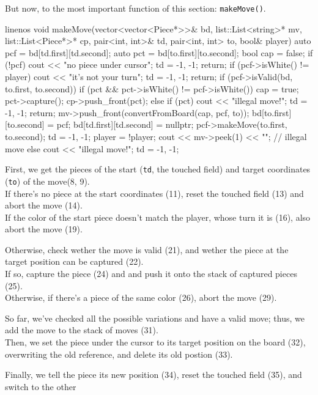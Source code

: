 But now, to the most important function of this section: \texttt{makeMove()}.

\begin{cpp*}{linenos}
void makeMove(vector<vector<Piece*>>& bd,
              list::List<string>* mv,
              list::List<Piece*>* cp,
              pair<int, int>& td,
              pair<int, int> to,
              bool& player)
{
  auto pcf = bd[td.first][td.second];
  auto pct = bd[to.first][to.second];
  bool cap = false;
  if (!pcf) {
    cout << "no piece under cursor\n";
    td = {-1, -1};
    return;
  }
  if (pcf->isWhite() != player) {
    cout << "it's not your turn\n";
    td = {-1, -1};
    return;
  }
  if (pcf->isValid(bd, to.first, to.second)) {
    if (pct && pct->isWhite() != pcf->isWhite()) {
      cap = true;
      pct->capture();
      cp->push_front(pct);
    } else if (pct) {
      cout << "illegal move!\n";
      td = {-1, -1};
      return;
    }
    mv->push_front(convertFromBoard(cap, pcf, to));
    bd[to.first][to.second] = pcf;
    bd[td.first][td.second] = nullptr;
    pcf->makeMove(to.first, to.second);
    td = {-1, -1};
    player = !player;
    cout << mv->peek(1) << "\n";
  // illegal move
  } else {
    cout << "illegal move!\n";
    td = {-1, -1};
  }
}
\end{cpp*}

First, we get the pieces of the start (\texttt{td}, the touched field) and target coordinates (\texttt{to})
of the move(8, 9).\\
If there's no piece at the start coordinates (11), reset the touched field (13) and abort the move (14).\\
If the color of the start piece doesn't match the player, whose turn it is (16), also abort the move (19).

Otherwise, check wether the move is valid (21), and wether the piece at the target position can be
captured (22).\\
If so, capture the piece (24) and and push it onto the stack of captured pieces (25).\\
Otherwise, if there's a piece of the same color (26), abort the move (29).

So far, we've checked all the possible variations and have a valid move; thus, we add the move to the
stack of moves (31).\\
Then, we set the piece under the cursor to its target position on the board (32), overwriting the old
reference, and delete its old postion (33).

Finally, we tell the piece its new position (34), reset the touched field (35), and switch to the other

